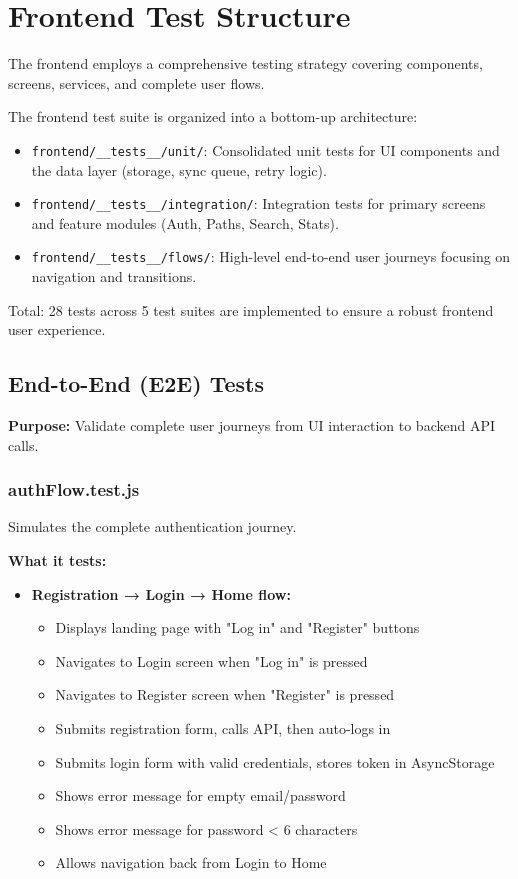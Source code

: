 \section{Frontend Test Structure}
\label{sec:frontend_test_structure}

The frontend employs a comprehensive testing strategy covering components, screens, services, and complete user flows.

The frontend test suite is organized into a bottom-up architecture:
\begin{itemize}
    \item \texttt{frontend/\_\_tests\_\_/unit/}: Consolidated unit tests for UI components and the data layer (storage, sync queue, retry logic).
    \item \texttt{frontend/\_\_tests\_\_/integration/}: Integration tests for primary screens and feature modules (Auth, Paths, Search, Stats).
    \item \texttt{frontend/\_\_tests\_\_/flows/}: High-level end-to-end user journeys focusing on navigation and transitions.
\end{itemize}

Total: 28 tests across 5 test suites are implemented to ensure a robust frontend user experience.

\subsection{End-to-End (E2E) Tests}
\label{subsec:frontend_e2e_tests}

\textbf{Purpose:} Validate complete user journeys from UI interaction to backend API calls.

\subsubsection{authFlow.test.js}
\label{subsubsec:auth_flow_test}

Simulates the complete authentication journey.

\textbf{What it tests:}
\begin{itemize}
    \item \textbf{Registration → Login → Home flow:}
    \begin{itemize}
        \item Displays landing page with "Log in" and "Register" buttons
        \item Navigates to Login screen when "Log in" is pressed
        \item Navigates to Register screen when "Register" is pressed
        \item Submits registration form, calls API, then auto-logs in
        \item Submits login form with valid credentials, stores token in AsyncStorage
        \item Shows error message for empty email/password
        \item Shows error message for password < 6 characters
        \item Allows navigation back from Login to Home
    \end{itemize}
\end{itemize}

